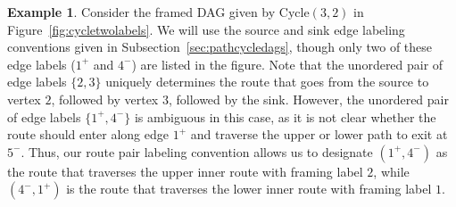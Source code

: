 \documentclass[12pt]{amsart}
\theoremstyle{definition}
\newtheorem{example}[theorem]{Example}
\newcommand\Cycle{\mathrm{Cycle}}
\begin{document}
\begin{example}
\label{ex:smallcyclelabels}
Consider the framed DAG given by $\Cycle(3,2)$ in Figure~\ref{fig:cycletwolabels}.
We will use the source and sink edge labeling conventions given in Subsection~\ref{sec:pathcycledags}, though only two of these edge labels ($1^+$ and $4^-$) are listed in the figure.
Note that the unordered pair of edge labels $\{2,3\}$ uniquely determines the route that goes from the source to vertex $2$, followed by vertex $3$, followed by the sink.
However, the unordered pair of edge labels $\{1^+,4^-\}$ is ambiguous in this case, as it is not clear whether the route should enter along edge $1^+$ and traverse the upper or lower path to exit at $5^-$.
Thus, our route pair labeling convention allows us to designate $(1^+,4^-)$ as the route that traverses the upper inner route with framing label $2$, while $(4^-,1^+)$ is the route that traverses the lower inner route with framing label $1$.
\end{example}
\end{document}

